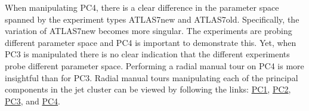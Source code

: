 When manipulating PC4, there is a clear difference in the parameter
space spanned by the experiment types ATLAS7new and ATLAS7old.
Specifically, the variation of ATLAS7new becomes more singular. The
experiments are probing different parameter space and PC4 is important
to demonstrate this. Yet, when PC3 is manipulated there is no clear
indication that the different experiments probe different parameter
space. Performing a radial manual tour on PC4 is more insightful than
for PC3. Radial manual tours manipulating each of the principal
components in the jet cluster can be viewed by following the links:
\href{https://nspyrison.netlify.com/thesis/jetcluster_manualtour_pc1/}{PC1},
\href{https://nspyrison.netlify.com/thesis/jetcluster_manualtour_pc2/}{PC2},
\href{https://nspyrison.netlify.com/thesis/jetcluster_manualtour_pc3/}{PC3},
and
\href{https://nspyrison.netlify.com/thesis/jetcluster_manualtour_pc4/}{PC4}.

